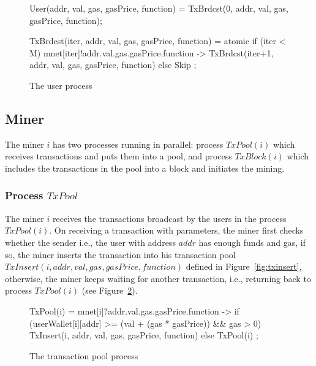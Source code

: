 \documentclass{KERauth}
\begin{document}
\begin{figure}[h]
\begin{center}
\begin{boxedverbatim}
User(addr, val, gas, gasPrice, function) =
            TxBrdcst(0, addr, val, gas, gasPrice, function);
            
TxBrdcst(iter, addr, val, gas, gasPrice, function) =
  atomic{
    if (iter < M) {
      mnet[iter]!addr.val.gas.gasPrice.function ->
      TxBrdcst(iter+1, addr, val, gas, gasPrice, function) }
    else {
      Skip } };
\end{boxedverbatim}
\end{center}
\caption{The user process}\label{fig:user}
\end{figure}

\subsection{Miner}\label{sec:miner}

The miner $i$ has two processes running in parallel: process $TxPool(i)$ which receives transactions and puts them into a pool, and process $TxBlock(i)$ which includes the transactions in the pool into a block and initiates the mining. 

\subsubsection{Process $TxPool$}

The miner $i$ receives the transactions broadcast by the users in the process $TxPool(i)$. On receiving a transaction with parameters, the miner first checks whether the sender i.e., the user with address $addr$ has enough funds and gas, if so, the miner inserts the transaction into his transaction pool $TxInsert(i, addr, val, gas, gasPrice, function)$ defined in Figure~\ref{fig:txinsert}, otherwise, the miner keeps waiting for another transaction, i.e., returning back to process $TxPool(i)$ (see Figure~\ref{fig:txpool}).

\begin{figure}[h]
\begin{center}
\begin{boxedverbatim}
TxPool(i) =
  mnet[i]?addr.val.gas.gasPrice.function ->
  if (userWallet[i][addr] >= (val + (gas * gasPrice)) && gas > 0) 
        {TxInsert(i, addr, val, gas, gasPrice, function) }
  else {TxPool(i) };
\end{boxedverbatim}
\end{center}
\caption{The transaction pool process}\label{fig:txpool}
\end{figure}
\end{document}
